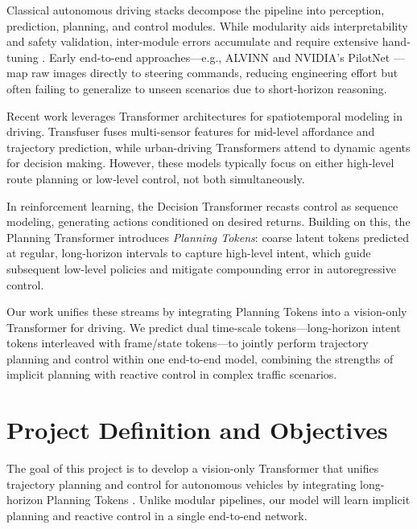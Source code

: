 \documentclass[11pt,a4paper]{article}
\begin{document}
Classical autonomous driving stacks decompose the pipeline into perception, prediction, planning, and control modules. While modularity aids interpretability and safety validation, inter-module errors accumulate and require extensive hand‐tuning \cite{Paden2016survey,Schwarting2018planning}. Early end-to-end approaches—e.g., ALVINN \cite{Pomerleau1989} and NVIDIA's PilotNet \cite{Bojarski2016endtoend}—map raw images directly to steering commands, reducing engineering effort but often failing to generalize to unseen scenarios due to short-horizon reasoning.

Recent work leverages Transformer architectures for spatiotemporal modeling in driving. Transfuser \cite{Pan2022transfuser} fuses multi-sensor features for mid-level affordance and trajectory prediction, while urban-driving Transformers \cite{Chen2023urban} attend to dynamic agents for decision making. However, these models typically focus on either high‐level route planning or low‐level control, not both simultaneously.

In reinforcement learning, the Decision Transformer \cite{Chen2021decision} recasts control as sequence modeling, generating actions conditioned on desired returns. Building on this, the Planning Transformer \cite{Clinton2024planning} introduces \emph{Planning Tokens}: coarse latent tokens predicted at regular, long-horizon intervals to capture high-level intent, which guide subsequent low-level policies and mitigate compounding error in autoregressive control.

Our work unifies these streams by integrating Planning Tokens into a vision-only Transformer for driving. We predict dual time-scale tokens—long-horizon intent tokens interleaved with frame/state tokens—to jointly perform trajectory planning and control within one end-to-end model, combining the strengths of implicit planning with reactive control in complex traffic scenarios.

\section*{Project Definition and Objectives}

The goal of this project is to develop a vision-only Transformer that unifies trajectory planning and control for autonomous vehicles by integrating long-horizon Planning Tokens \cite{Clinton2024planning}. Unlike modular pipelines, our model will learn implicit planning and reactive control in a single end-to-end network.
\end{document}
